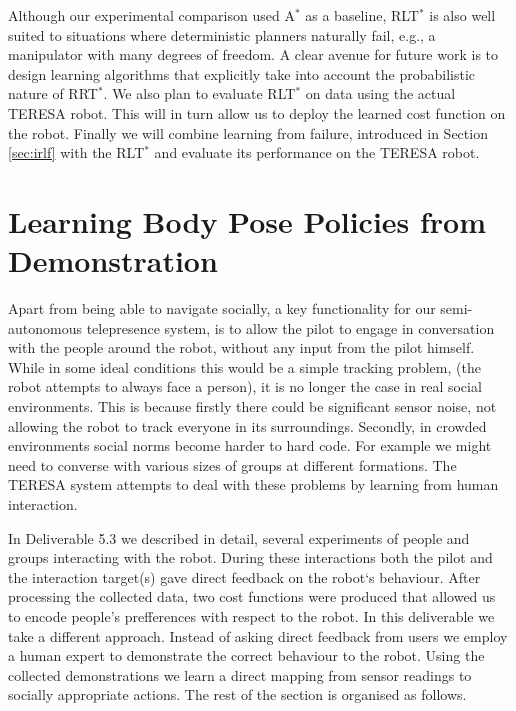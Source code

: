 \documentclass[a4paper,11pt]{report}
\begin{document}
 Although our experimental comparison used A$^*$ as a baseline, RLT$^*$ is also well suited to situations where deterministic planners naturally fail, e.g., a manipulator with many degrees of freedom. A clear avenue for future work is to design learning algorithms that explicitly take into account the probabilistic nature of RRT$^*$. We also plan to evaluate RLT$^*$ on data using the actual TERESA robot. This will in turn allow us to deploy the learned cost function on the robot. Finally we will combine learning from failure, introduced in Section \ref{sec:irlf} with the RLT$^*$ and evaluate its performance on the TERESA robot.

\clearpage





\section{Learning Body Pose Policies from Demonstration}
\label{sec:sl_policy}

Apart from being able to navigate socially, a key functionality for our semi-autonomous telepresence system, is to allow the pilot to engage in conversation 
with the people around the robot, without any input from the pilot himself. While in some ideal conditions this would be a simple tracking problem, (the robot attempts to always face a person), it is no longer the case in real social environments. This is because firstly there could be significant sensor noise, not allowing the robot to track everyone in its surroundings. Secondly, in crowded environments social norms become harder to hard code. For example we might need to converse with various sizes of groups at different formations. The TERESA system attempts to deal with these problems by learning from human interaction.

In Deliverable 5.3 we described in detail, several experiments of people and groups interacting with the robot. During these interactions both the pilot and the interaction target(s) gave direct feedback on the robot`s behaviour. After processing the collected data, two cost functions were produced that allowed us to encode people's prefferences with respect to the robot. In this deliverable we take a different approach. Instead of asking direct feedback from users we employ a human expert to demonstrate the correct behaviour to the robot. Using the collected demonstrations we learn a direct mapping from sensor readings to socially appropriate actions. The rest of the section is organised as follows. 
\end{document}
